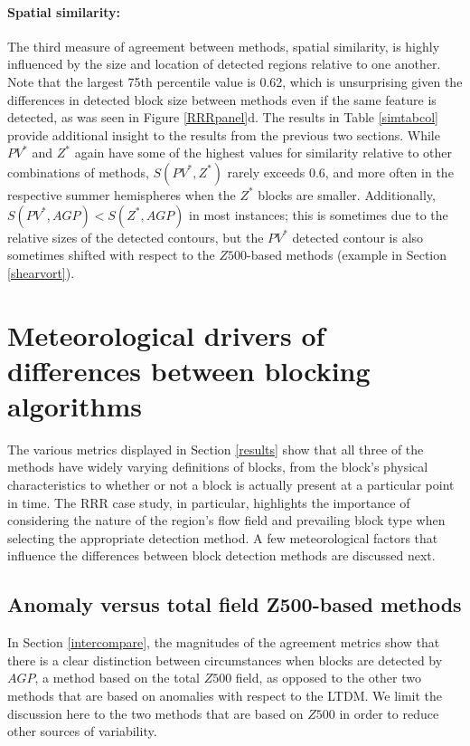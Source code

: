 \documentclass[smallextended]{svjour3}       %
\numberwithin{equation}{section}
\begin{document}
\paragraph{Spatial similarity:} The third measure of agreement between methods, spatial similarity, is highly influenced by the size and location of detected regions relative to one another. Note that the largest 75th percentile value is 0.62, which is unsurprising given the differences in detected block size between methods even if the same feature is detected, as was seen in Figure \ref{RRRpanel}d.   The results in Table \ref{simtabcol} provide additional insight to the results from the previous two sections. While $PV^*$ and $Z^*$ again have some of the highest values for similarity relative to other combinations of methods, $S(PV^*,Z^*)$ rarely exceeds 0.6, and more often in the respective summer hemispheres when the $Z^*$ blocks are smaller. Additionally, $S(PV^*,AGP)<S(Z^*,AGP)$ in most instances; this is sometimes due to the relative sizes of the detected contours, but the $PV^*$ detected contour is also sometimes shifted with respect to the $Z500$-based methods (example in Section \ref{shearvort}).%




\section{Meteorological drivers of differences between blocking algorithms}\label{influences}

The various metrics displayed in Section \ref{results} show that all three of the methods have widely varying definitions of blocks, from the block's physical characteristics to whether or not a block is actually present at a particular point in time. The RRR case study, in particular, highlights the importance of considering the nature of the region's flow field and prevailing block type when selecting the appropriate detection method. A few meteorological factors that influence the differences between block detection methods are discussed next.


\subsection{Anomaly versus total field Z500-based methods}\label{anominst}

In Section \ref{intercompare}, the magnitudes of the agreement metrics show that there is a clear distinction between circumstances when blocks are detected by $AGP$, a method based on the total $Z500$ field, as opposed to the other two methods that are based on anomalies with respect to the LTDM. We limit the discussion here to the two methods that are based on $Z500$ in order to reduce other sources of variability.
\end{document}
